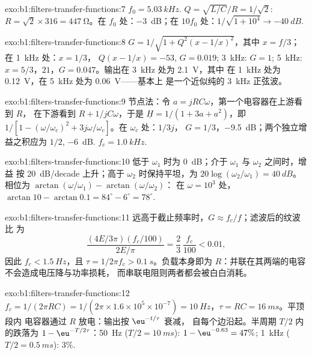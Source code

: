 \begin{solution}{exo:b1:filters-transfer-functions:7}
$f_0 = \qty{5.03}{kHz}$. $Q = \sqrt{L/C}/R = 1/\sqrt2$: $R = \sqrt2 \times
316 = \qty{447}{\ohm}$。在 $f_0$ 处：\qty{-3}{dB}；在 $10f_0$ 处：$1/\sqrt{1 +
10^4} \to \qty{-40}{dB}$.
\end{solution}

\begin{solution}{exo:b1:filters-transfer-functions:8}
$G = 1/\sqrt{1 + Q^2(x - 1/x)^2}$，其中 $x = f/3$；在 \qty{1}{kHz} 处：$x = 1/3$，
$Q(x - 1/x) = -53$, $G = 0.019$; \qty{3}{kHz}: $G = 1$; \qty{5}{kHz}:
$x = 5/3$，$21$，$G = 0.047$。输出在 \qty{3}{kHz} 处为 \qty{2.1}{V}，其中
在 \qty{1}{kHz} 处为 \qty{0.12}{V}，在 \qty{5}{kHz} 处为 \qty{0.06}{V}——基本上
是一个近似纯的 \qty{3}{kHz} 正弦波。
\end{solution}

\begin{solution}{exo:b1:filters-transfer-functions:9}
节点法：令 $a = jRC\omega$，第一个电容器在上游看到 $R$，
在下游看到 $R + 1/jC\omega$，于是 $\underline H = 1/(1 + 3a + a^2)$，即\
$1/[1 - (\omega/\omega_c)^2 + 3j\omega/\omega_c]$。在 $\omega_c$ 处：$1/3j$，
$G = 1/3$，\qty{-9.5}{dB}；两个独立增益之积应为
$1/2$, \qty{-6}{dB}. $f_c = \qty{1.0}{kHz}$.
\end{solution}

\begin{solution}{exo:b1:filters-transfer-functions:10}
低于 $\omega_1$ 时为 \qty{0}{dB}；介于 $\omega_1$ 与 $\omega_2$ 之间时，增益
按 \qty{20}{dB/decade} 上升；高于 $\omega_2$ 时保持平坦，为 $20\log(\omega_2/\omega_1) =
\qty{40}{dB}$。相位为 $\arctan(\omega/\omega_1) - \arctan(\omega/\omega_2)$：
在 $\omega = 10^3$ 处，$\arctan 10 - \arctan 0.1 = 84^\circ - 6^\circ =
78^\circ$.
\end{solution}

\begin{solution}{exo:b1:filters-transfer-functions:11}
远高于截止频率时，$G \approx f_c/f$；滤波后的纹波比
为
\[
\frac{(4E/3\pi)(f_c/100)}{2E/\pi} = \frac{2}{3}\,\frac{f_c}{100} < 0.01,
\]
因此 $f_c < \qty{1.5}{Hz}$，且 $\tau = 1/2\pi f_c > \qty{0.1}{s}$。负载本身即为
$R$：并联在其两端的电容不会造成电压降与功率损耗，
而串联电阻则两者都会被白白消耗。
\end{solution}

\begin{solution}{exo:b1:filters-transfer-functions:12}
$f_c = 1/(2\pi RC) = 1/(2\pi \times 1.6\times10^5 \times 10^{-7}) =
\qty{10}{Hz}$，$\tau = RC = \qty{16}{ms}$。平顶段内
电容器通过 $R$ 放电：输出按 $\eu^{-t/\tau}$ 衰减，
自每个边沿起。半周期 $T/2$ 内的跌落为 $1 - \eu^{-T/2\tau}$：\qty{50}{Hz}
($T/2 = \qty{10}{ms}$): $1 - \eu^{-0.63} = 47\%$; \qty{1}{kHz}
($T/2 = \qty{0.5}{ms}$): $3\%$.
\end{solution}

